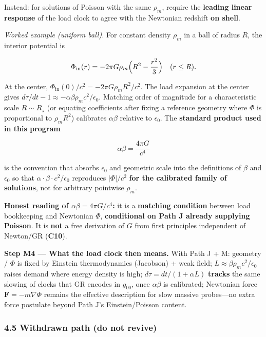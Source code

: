 \documentclass[
  11pt,
]{article}
\begin{document}
Instead: for solutions of Poisson with the same \(\rho_m\), require the \textbf{leading linear response} of the load clock to agree with the Newtonian redshift \textbf{on shell}.

\emph{Worked example (uniform ball).} For constant density \(\rho_m\) in a ball of radius \(R\), the interior potential is

\[
\Phi_{\mathrm{in}}(r)
=
-2\pi G\rho_m\Bigl(R^2-\frac{r^2}{3}\Bigr)
\quad(r\le R).
\]

At the center, \(\Phi_{\mathrm{in}}(0)/c^2=-2\pi G\rho_m R^2/c^2\). The load expansion at the center gives \(d\tau/dt-1\approx-\alpha\beta\rho_m c^2/\epsilon_0\). Matching order of magnitude for a characteristic scale \(R\sim R_\star\) (or equating coefficients after fixing a reference geometry where \(\Phi\) is proportional to \(\rho_m R^2\)) calibrates \(\alpha\beta\) relative to \(\epsilon_0\). The \textbf{standard product used in this program}

\[
\alpha\beta = \frac{4\pi G}{c^4}
\]

is the convention that absorbs \(\epsilon_0\) and geometric scale into the definitions of \(\beta\) and \(\epsilon_0\) so that \(\alpha\cdot\beta\cdot c^2/\epsilon_0\) reproduces \(\lvert\Phi\rvert/c^2\) \textbf{for the calibrated family of solutions}, not for arbitrary pointwise \(\rho_m\).

\textbf{Honest reading of \(\alpha\beta=4\pi G/c^4\):} it is a \textbf{matching condition} between load bookkeeping and Newtonian \(\Phi\), \textbf{conditional on Path J already supplying Poisson}. It is \textbf{not} a free derivation of \(G\) from first principles independent of Newton/GR (\textbf{C10}).

\textbf{Step M4 --- What the load clock then means.} With Path J + M: geometry / \(\Phi\) is fixed by Einstein thermodynamics (Jacobson) + weak field; \(L\approx\beta\rho_m c^2/\epsilon_0\) raises demand where energy density is high; \(d\tau=dt/(1+\alpha L)\) \textbf{tracks} the same slowing of clocks that GR encodes in \(g_{00}\), once \(\alpha\beta\) is calibrated; Newtonian force \(\mathbf{F}=-m\nabla\Phi\) remains the effective description for slow massive probes---no extra force postulate beyond Path J's Einstein/Poisson content.

\subsubsection{4.5 Withdrawn path (do not revive)}\label{withdrawn-path-do-not-revive}
\end{document}
